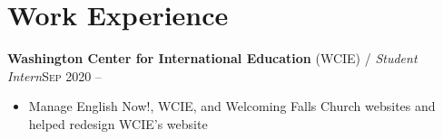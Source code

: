 \documentclass[12pt, a4paper]{article}
\begin{document}


\vspace{-8mm}
\section*{Work Experience}
\vspace{-2mm}


\textbf{Washington Center for International Education} (WCIE) / \textit{Student Intern}\hfill\textsc{Sep 2020 --}\\
\begin{itemize}
    \vspace{-8mm}
    \item Manage English Now!, WCIE, and Welcoming Falls Church websites and helped redesign WCIE's website
\end{itemize}


\end{document}
